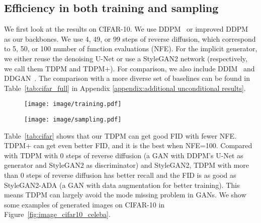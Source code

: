 \documentclass{article} \usepackage{iclr2023_conference,times}
\def\Figref#1{Figure~\ref{#1}}
\theoremstyle{plain}
\theoremstyle{definition}
\theoremstyle{remark}
\begin{document}
{\subsection{Efficiency in both training and sampling}

We first look at the results on CIFAR-10. We use DDPM~\citep{ddpm} or improved DDPM~\citep{nichol2021improved} as our backbones. We use 4, 49, or 99 steps of reverse diffusion, which correspond to 5, 50, or 100 number of function evaluations (NFE). For the implicit generator, we either reuse the denoising U-Net or use a StyleGAN2 network (respectively, we call them TDPM and TDPM+). {For comparison, we also include DDIM~\citep{ddim} and DDGAN~\citep{xiao2021tackling}. The comparison with a more diverse set of baselines can be found in Table~\ref{tab:cifar_full} in Appendix \ref{appendix:additional unconditional results}.} 

\begin{figure}[t]
\vspace{-2mm}
\begin{minipage}[t]{0.48\linewidth}
\vspace{0mm}
    \centering
    \texttt{[image: image/training.pdf]}\vspace{-3mm}
    \label{fig:iter_time}
\end{minipage}\hfill
\begin{minipage}[t]{0.48\linewidth}
\vspace{0mm}
    \centering
    \texttt{[image: image/sampling.pdf]}\vspace{-3mm}
    \label{fig:fid_time}
\end{minipage}
\vspace{0mm}
\end{figure}




Table~\ref{tab:cifar} shows that our TDPM can get good FID with fewer NFE. TDPM+ can get even better FID, and it is the best when NFE=100. Compared with TDPM with 0 steps of reverse diffusion (a GAN with DDPM's U-Net as generator and StyleGAN2 as discriminator) and StyleGAN2, TDPM with more than 0 steps of reverse diffusion has better recall and the FID is as good as StyleGAN2-ADA (a GAN with data augmentation for better training). This means TDPM can largely avoid the mode missing problem in GANs. We show some examples of generated images on CIFAR-10 in \Figref{fig:image_cifar10_celeba}.



}
\end{document}
